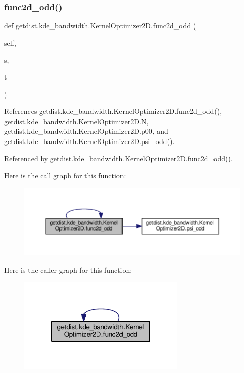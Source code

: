 \subsubsection{\texorpdfstring{func2d\+\_\+odd()}{func2d\_odd()}}
{\footnotesize\ttfamily def getdist.\+kde\+\_\+bandwidth.\+Kernel\+Optimizer2\+D.\+func2d\+\_\+odd (\begin{DoxyParamCaption}\item[{}]{self,  }\item[{}]{s,  }\item[{}]{t }\end{DoxyParamCaption})}



References getdist.\+kde\+\_\+bandwidth.\+Kernel\+Optimizer2\+D.\+func2d\+\_\+odd(), getdist.\+kde\+\_\+bandwidth.\+Kernel\+Optimizer2\+D.\+N, getdist.\+kde\+\_\+bandwidth.\+Kernel\+Optimizer2\+D.\+p00, and getdist.\+kde\+\_\+bandwidth.\+Kernel\+Optimizer2\+D.\+psi\+\_\+odd().



Referenced by getdist.\+kde\+\_\+bandwidth.\+Kernel\+Optimizer2\+D.\+func2d\+\_\+odd().

Here is the call graph for this function\+:
\nopagebreak
\begin{figure}[H]
\begin{center}
\leavevmode
\includegraphics[width=350pt]{classgetdist_1_1kde__bandwidth_1_1KernelOptimizer2D_ac0096bcca95e418b999498142fe3e411_cgraph}
\end{center}
\end{figure}
Here is the caller graph for this function\+:
\nopagebreak
\begin{figure}[H]
\begin{center}
\leavevmode
\includegraphics[width=226pt]{classgetdist_1_1kde__bandwidth_1_1KernelOptimizer2D_ac0096bcca95e418b999498142fe3e411_icgraph}
\end{center}
\end{figure}
\mbox{\label{classgetdist_1_1kde__bandwidth_1_1KernelOptimizer2D_afd388bc2eafda3fe7f8dca0c4dbd2157}} 
